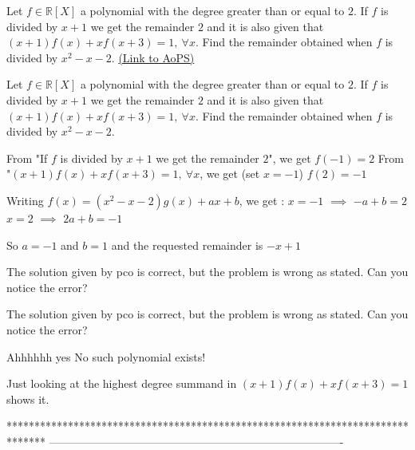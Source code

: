 \begin{problem}
	Let $f\in \mathbb{R}[X]$ a polynomial with the degree greater than or equal to $2$. If $f$ is divided by $x+1$ we get the remainder $2$ and it is also given that $(x+1)f(x)+xf(x+3)=1,\ \forall x$. Find the remainder obtained when $f$ is divided by $x^2-x-2$.
	\flushright \href{https://artofproblemsolving.com/community/c6h468250}{(Link to AoPS)}
\end{problem}



\begin{solution}
	\begin{tcolorbox}Let $f\in \mathbb{R}[X]$ a polynomial with the degree greater than or equal to $2$. If $f$ is divided by $x+1$ we get the remainder $2$ and it is also given that $(x+1)f(x)+xf(x+3)=1,\ \forall x$. Find the remainder obtained when $f$ is divided by $x^2-x-2$.\end{tcolorbox}
From "If $f$ is divided by $x+1$ we get the remainder $2$", we get $f(-1)=2$
From "$(x+1)f(x)+xf(x+3)=1,\ \forall x$, we get (set $x=-1$) $f(2)=-1$

Writing $f(x)=(x^2-x-2)g(x)+ax+b$, we get :
$x=-1$ $\implies$ $-a+b=2$
$x=2$ $\implies$ $2a+b=-1$

So $a=-1$ and $b=1$ and the requested remainder is $\boxed{-x+1}$
\end{solution}



\begin{solution}
	The solution given by pco is correct, but the problem is wrong as stated. Can you notice the error?
\end{solution}



\begin{solution}
	\begin{tcolorbox}The solution given by pco is correct, but the problem is wrong as stated. Can you notice the error?\end{tcolorbox}
Ahhhhhh yes 
No such polynomial exists!

Just looking at the highest degree summand in $(x+1)f(x)+xf(x+3)=1$ shows it.
\end{solution}
*******************************************************************************
-------------------------------------------------------------------------------

